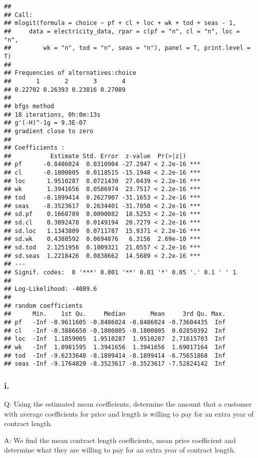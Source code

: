 \documentclass[
]{article}
\begin{document}
\begin{verbatim}
## 
## Call:
## mlogit(formula = choice ~ pf + cl + loc + wk + tod + seas - 1, 
##     data = electricity_data, rpar = c(pf = "n", cl = "n", loc = "n", 
##         wk = "n", tod = "n", seas = "n"), panel = T, print.level = T)
## 
## Frequencies of alternatives:choice
##       1       2       3       4 
## 0.22702 0.26393 0.23816 0.27089 
## 
## bfgs method
## 18 iterations, 0h:0m:13s 
## g'(-H)^-1g = 9.3E-07 
## gradient close to zero 
## 
## Coefficients :
##           Estimate Std. Error  z-value  Pr(>|z|)    
## pf      -0.8486024  0.0310904 -27.2947 < 2.2e-16 ***
## cl      -0.1800805  0.0118515 -15.1948 < 2.2e-16 ***
## loc      1.9510287  0.0721430  27.0439 < 2.2e-16 ***
## wk       1.3941656  0.0586974  23.7517 < 2.2e-16 ***
## tod     -8.1899414  0.2627907 -31.1653 < 2.2e-16 ***
## seas    -8.3523617  0.2634401 -31.7050 < 2.2e-16 ***
## sd.pf    0.1668789  0.0090082  18.5253 < 2.2e-16 ***
## sd.cl    0.3092478  0.0149194  20.7279 < 2.2e-16 ***
## sd.loc   1.1343809  0.0711787  15.9371 < 2.2e-16 ***
## sd.wk    0.4388592  0.0694876   6.3156  2.69e-10 ***
## sd.tod   2.1251956  0.1009321  21.0557 < 2.2e-16 ***
## sd.seas  1.2218426  0.0838662  14.5689 < 2.2e-16 ***
## ---
## Signif. codes:  0 '***' 0.001 '**' 0.01 '*' 0.05 '.' 0.1 ' ' 1
## 
## Log-Likelihood: -4089.6
## 
## random coefficients
##      Min.    1st Qu.     Median       Mean     3rd Qu. Max.
## pf   -Inf -0.9611605 -0.8486024 -0.8486024 -0.73604435  Inf
## cl   -Inf -0.3886650 -0.1800805 -0.1800805  0.02850392  Inf
## loc  -Inf  1.1859005  1.9510287  1.9510287  2.71615703  Inf
## wk   -Inf  1.0981595  1.3941656  1.3941656  1.69017164  Inf
## tod  -Inf -9.6233640 -8.1899414 -8.1899414 -6.75651868  Inf
## seas -Inf -9.1764820 -8.3523617 -8.3523617 -7.52824142  Inf
\end{verbatim}

\hypertarget{i.-4}{%
\subsubsection{i.}\label{i.-4}}

Q: Using the estimated mean coefficients, determine the amount that a
customer with average coefficients for price and length is willing to
pay for an extra year of contract length.


A: We find the mean contract length coefficients, mean price coefficient
and determine what they are willing to pay for an extra year of contract
length.
\end{document}
